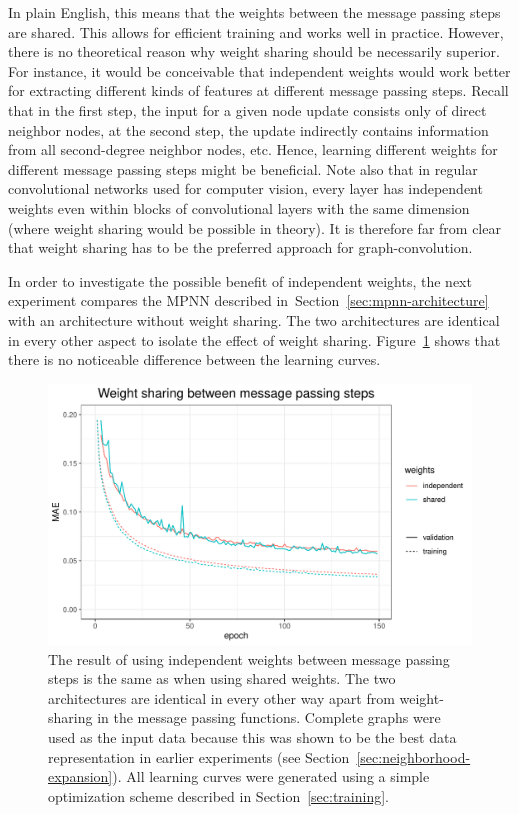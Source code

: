 In plain English, this means that the weights between the message passing steps are shared. This allows for efficient training and works well in practice. However, there is no theoretical reason why weight sharing should be necessarily superior. For instance, it would be conceivable that independent weights would work better for extracting different kinds of features at different message passing steps. Recall that in the first step, the input for a given node update consists only of direct neighbor nodes, at the second step, the update indirectly contains information from all second-degree neighbor nodes, etc. Hence, learning different weights for different message passing steps might be beneficial. Note also that in regular convolutional networks used for computer vision, every layer has independent weights even within blocks of convolutional layers with the same dimension (where weight sharing would be possible in theory). It is therefore far from clear that weight sharing has to be the preferred approach for graph-convolution.

In order to investigate the possible benefit of independent weights, the next experiment compares the MPNN described in~Section~\ref{sec:mpnn-architecture} with an architecture without weight sharing. The two architectures are identical in every other aspect to isolate the effect of weight sharing. Figure~\ref{fig:weight-sharing} shows that there is no noticeable difference between the learning curves.


\begin{figure}[H]
	\includegraphics[width=\linewidth]{figures/weight-sharing.pdf}
	\caption{The result of using independent weights between message passing steps is the same as when using shared weights. The two architectures are identical in every other way apart from weight-sharing in the message passing functions. Complete graphs were used as the input data because this was shown to be the best data representation in earlier experiments (see Section~\ref{sec:neighborhood-expansion}). All learning curves were generated using a simple optimization scheme described in Section~\ref{sec:training}.}
	\label{fig:weight-sharing}
\end{figure}


